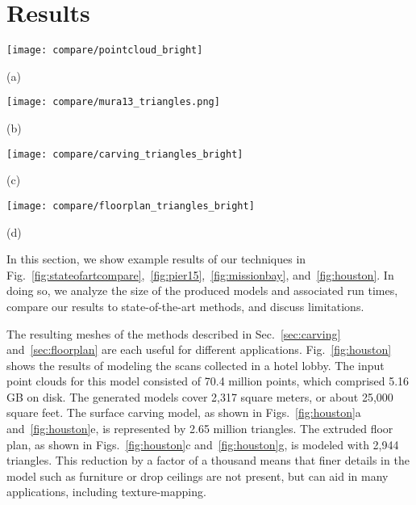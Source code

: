 \documentclass[10pt,twocolumn,twoside]{IEEEtran}
\begin{document}
\section{Results}
\label{sec:results}

\begin{figure*}[t]

	\begin{minipage}[b]{0.58\linewidth}
		\centerline{\texttt{[image: compare/pointcloud\_bright]}}
		\centerline{(a)}\medskip
	\end{minipage}
	\hfill
	\begin{minipage}[b]{0.4\linewidth}
		\centerline{\texttt{[image: compare/mura13\_triangles.png]}}
		\centerline{(b)}\medskip
	\end{minipage}
	\hfill
	\begin{minipage}[b]{0.58\linewidth}
		\centerline{\texttt{[image: compare/carving\_triangles\_bright]}}
		\centerline{(c)}\medskip
	\end{minipage}
	\hfill
	\begin{minipage}[b]{0.4\linewidth}
		\centerline{\texttt{[image: compare/floorplan\_triangles\_bright]}}
		\centerline{(d)}\medskip
	\end{minipage}

	\caption{Comparison to state-of-the-art method: (a) Static point-cloud scans from VmmlLab set of~\cite{Mattausch14}; (b) reconstruction of dataset using method described in~\cite{Mura13}; (c) reconstruction of dataset using method from Sec.~\ref{sec:carving}; (d) reconstruction of dataset using method from Sec.~\ref{sec:floorplan}.}
	\label{fig:stateofartcompare}

\end{figure*}

In this section, we show example results of our techniques in Fig.~\ref{fig:stateofartcompare},~\ref{fig:pier15},~\ref{fig:missionbay}, and~\ref{fig:houston}.  In doing so, we analyze the size of the produced models and associated run times, compare our results to state-of-the-art methods, and discuss limitations.


The resulting meshes of the methods described in Sec.~\ref{sec:carving} and~\ref{sec:floorplan} are each useful for different applications.  Fig.~\ref{fig:houston} shows the results of modeling the scans collected in a hotel lobby.  The input point clouds for this model consisted of 70.4 million points, which comprised 5.16 GB on disk.  The generated models cover 2,317 square meters, or about 25,000 square feet.  The surface carving model, as shown in Figs.~\ref{fig:houston}a and~\ref{fig:houston}e, is represented by 2.65 million triangles.  The extruded floor plan, as shown in Figs.~\ref{fig:houston}c and~\ref{fig:houston}g, is modeled with 2,944 triangles.  This reduction by a factor of a thousand means that finer details in the model such as furniture or drop ceilings are not present, but can aid in many applications, including texture-mapping.
\end{document}
